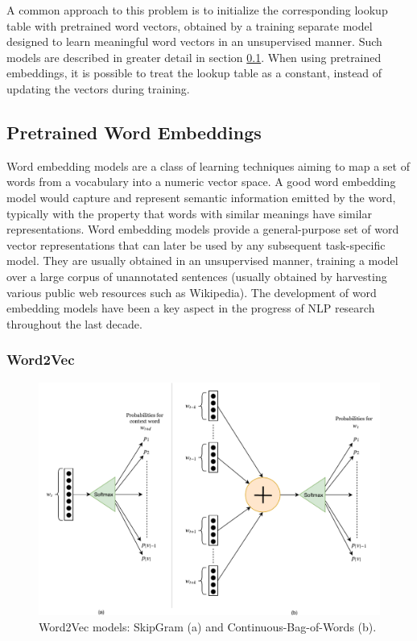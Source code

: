 A common approach to this problem is to initialize the corresponding lookup table with pretrained word vectors, obtained by a training separate model designed to learn meaningful word vectors in an unsupervised manner. Such models are described in greater detail in section \ref{section:wordembeddings}. When using pretrained embeddings, it is possible to treat the lookup table as a constant, instead of updating the vectors during training. 

\subsection{Pretrained Word Embeddings} \label{section:wordembeddings}
Word embedding models are a class of learning techniques aiming to map a set of words from a vocabulary into a numeric vector space. A good word embedding model would capture and represent semantic information emitted by the word, typically with the property that words with similar meanings have similar representations. Word embedding models provide a general-purpose set of word vector representations that can later be used by any subsequent task-specific model. They are usually obtained in an unsupervised manner, training a model over a large corpus of unannotated sentences (usually obtained by harvesting various public web resources such as Wikipedia). The development of word embedding models have been a key aspect in the progress of NLP research throughout the last decade.

\subsubsection{Word2Vec}

\begin{figure}
    \centering
    \includegraphics[width=1\textwidth]{Figures/word2vec.pdf}
    \caption{Word2Vec models: SkipGram (a) and Continuous-Bag-of-Words (b).}
    \label{fig:word2vec}
\end{figure}

